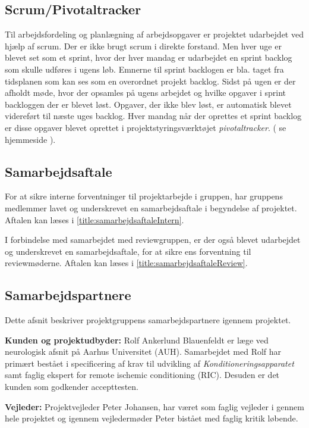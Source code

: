 \subsection{Scrum/Pivotaltracker} \label{title:scrum}
Til arbejdsfordeling og planlægning af arbejdsopgaver er projektet udarbejdet ved hjælp af scrum. Der er ikke brugt scrum i direkte forstand. Men hver uge er blevet set som et sprint, hvor der hver mandag er udarbejdet en sprint backlog som skulle udføres i ugens løb. Emnerne til sprint backlogen er bla. taget fra tidsplanen som kan ses som en overordnet projekt backlog. Sidst på ugen er der afholdt møde, hvor der opsamles på ugens arbejdet og hvilke opgaver i sprint backloggen der er blevet løst. Opgaver, der ikke blev løst, er automatisk blevet videreført til næste uges backlog. Hver mandag når der oprettes et sprint backlog er disse opgaver blevet oprettet i projektstyringsværktøjet \textit{pivotaltracker}. ( se hjemmeside ). 

\subsection{Samarbejdsaftale}
For at sikre interne forventninger til projektarbejde i gruppen, har gruppens medlemmer lavet og underskrevet en samarbejdsaftale i begyndelse af projektet. Aftalen kan læses i \ref{title:samarbejdsaftaleIntern}.

I forbindelse med samarbejdet med reviewgruppen, er der også blevet udarbejdet og underskrevet en samarbejdsaftale, for at sikre ens forventning til reviewmøderne. Aftalen kan læses i \ref{title:samarbejdsaftaleReview}.

\subsection{Samarbejdspartnere} \label{title:samarbejdspartnere}
Dette afsnit beskriver projektgruppens samarbejdspartnere igennem projektet. 

\textbf{Kunden og projektudbyder:} Rolf Ankerlund Blauenfeldt er læge ved neurologisk afsnit på Aarhus Universitet (AUH). Samarbejdet med Rolf har primært bestået i specificering af krav til udvikling af \textit{Konditioneringsapparatet} samt faglig ekspert for remote ischemic conditioning (RIC). Desuden er det kunden som godkender accepttesten.

\textbf{Vejleder:} Projektvejleder Peter Johansen, har været som faglig vejleder i gennem hele projektet og igennem vejledermøder Peter bistået med faglig kritik løbende. 

